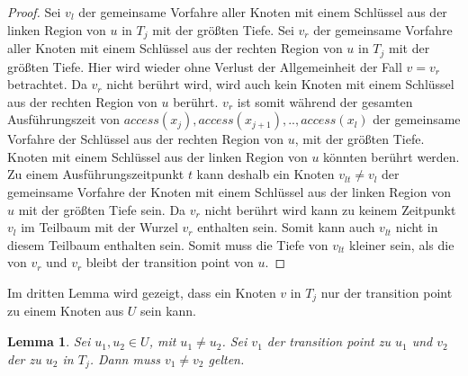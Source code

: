 \documentclass[a4paper,12pt]{article}
\newtheorem{Lemma}{Lemma}[section]
\begin{document}
\begin{proof}
	Sei $v_l$ der gemeinsame Vorfahre aller Knoten mit einem Schlüssel aus der linken Region von $u$ in $T_j$ mit der größten Tiefe. Sei $v_r$ der gemeinsame Vorfahre aller Knoten mit einem Schlüssel aus der rechten Region von $u$ in $T_j$ mit der größten Tiefe. Hier wird wieder ohne Verlust der Allgemeinheit der Fall $v = v_r$ betrachtet. Da $v_r$ nicht berührt wird, wird auch kein Knoten mit einem Schlüssel aus der rechten Region von $u$ berührt. $v_r$ ist somit während der gesamten Ausführungszeit von $\textit{access}\left(x_j\right),\textit{access}\left(x_{j+1}\right),..,\textit{access}\left(x_l\right)$  der gemeinsame Vorfahre der Schlüssel aus der rechten Region von $u$, mit der größten Tiefe. Knoten mit einem Schlüssel aus der linken Region von $u$ könnten berührt werden. Zu einem Ausführungszeitpunkt $t$ kann deshalb ein Knoten $v_{lt} \ne v_l$ der gemeinsame Vorfahre der Knoten mit einem Schlüssel aus der linken Region von $u$ mit der größten Tiefe sein. Da $v_r$ nicht berührt wird kann zu keinem Zeitpunkt $v_l$ im Teilbaum mit der Wurzel $v_r$ enthalten sein. Somit kann auch $v_{lt}$ nicht in diesem Teilbaum enthalten sein. Somit muss die Tiefe von  $v_{lt}$ kleiner sein, als die von $v_r$ und $v_r$ bleibt der transition point von $u$. 
\end{proof}

\noindent Im dritten Lemma wird gezeigt, dass ein Knoten $v$ in $T_j$ nur der transition point zu einem Knoten aus $U$ sein kann.


\begin{Lemma}\label{lemmaDemaine3}
	Sei $u_1, u_2 \in U$, mit $u_1 \ne u_2$.  Sei $v_1$ der transition point zu $u_1$ und $v_2$ der zu $u_2$ in $T_j$. Dann muss $v_1 \neq v_2$ gelten.
\end{Lemma}
\end{document}
